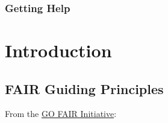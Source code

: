 \documentclass[
]{book}
\begin{document}
\hypertarget{getting-help}{%
\subsection*{Getting Help}\label{getting-help}}

\hypertarget{introduction}{%
\chapter{Introduction}\label{introduction}}

\hypertarget{fair-guiding-principles}{%
\section{FAIR Guiding Principles}\label{fair-guiding-principles}}

From the \href{https://www.go-fair.org/fair-principles/}{GO FAIR Initiative}:
\end{document}
